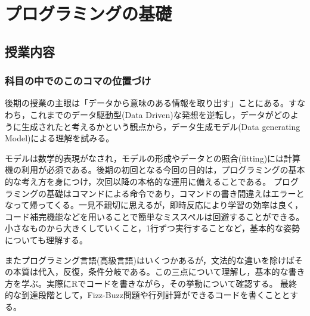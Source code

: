 \section{プログラミングの基礎}
\subsection{授業内容}
\subsubsection{科目の中でのこのコマの位置づけ}
後期の授業の主眼は「データから意味のある情報を取り出す」ことにある。すなわち，これまでのデータ駆動型(Data Driven)な発想を逆転し，データがどのように生成されたと考えるかという観点から，データ生成モデル(Data generating Model)による理解を試みる。

モデルは数学的表現がなされ，モデルの形成やデータとの照合(fitting)には計算機の利用が必須である。後期の初回となる今回の目的は，プログラミングの基本的な考え方を身につけ，次回以降の本格的な運用に備えることである。
プログラミングの基礎はコマンドによる命令であり，コマンドの書き間違えはエラーとなって帰ってくる。一見不親切に思えるが，即時反応により学習の効率は良く，コード補完機能などを用いることで簡単なミススペルは回避することができる。小さなものから大きくしていくこと，1行ずつ実行することなど，基本的な姿勢についても理解する。

またプログラミング言語(高級言語)はいくつかあるが，文法的な違いを除けばその本質は代入，反復，条件分岐である。この三点について理解し，基本的な書き方を学ぶ。実際にRでコードを書きながら，その挙動について確認する。
最終的な到達段階として，Fizz-Buzz問題や行列計算ができるコードを書くこととする。

